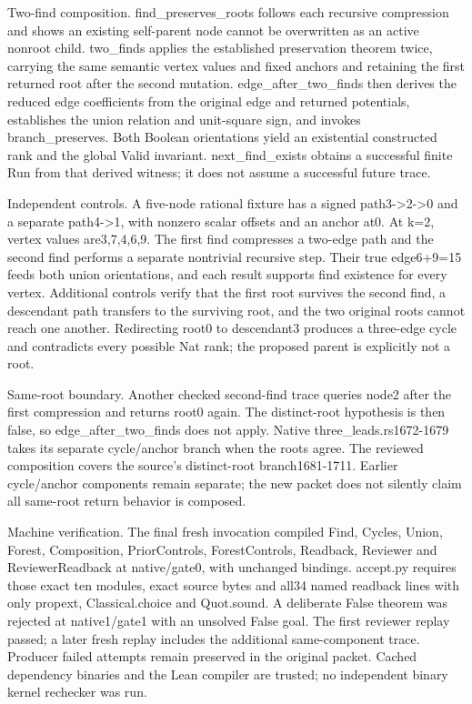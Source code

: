 \documentclass[10pt]{article}
\begin{document}
Two-find composition. find\_preserves\_roots follows each recursive compression and shows an existing self-parent node cannot be overwritten as an active nonroot child. two\_finds applies the established preservation theorem twice, carrying the same semantic vertex values and fixed anchors and retaining the first returned root after the second mutation. edge\_after\_two\_finds then derives the reduced edge coefficients from the original edge and returned potentials, establishes the union relation and unit-square sign, and invokes branch\_preserves. Both Boolean orientations yield an existential constructed rank and the global Valid invariant. next\_find\_exists obtains a successful finite Run from that derived witness; it does not assume a successful future trace.\par\medskip
Independent controls. A five-node rational fixture has a signed path3->2->0 and a separate path4->1, with nonzero scalar offsets and an anchor at0. At k=2, vertex values are3,7,4,6,9. The first find compresses a two-edge path and the second find performs a separate nontrivial recursive step. Their true edge6+9=15 feeds both union orientations, and each result supports find existence for every vertex. Additional controls verify that the first root survives the second find, a descendant path transfers to the surviving root, and the two original roots cannot reach one another. Redirecting root0 to descendant3 produces a three-edge cycle and contradicts every possible Nat rank; the proposed parent is explicitly not a root.\par\medskip
Same-root boundary. Another checked second-find trace queries node2 after the first compression and returns root0 again. The distinct-root hypothesis is then false, so edge\_after\_two\_finds does not apply. Native three\_leads.rs1672-1679 takes its separate cycle/anchor branch when the roots agree. The reviewed composition covers the source's distinct-root branch1681-1711. Earlier cycle/anchor components remain separate; the new packet does not silently claim all same-root return behavior is composed.\par\medskip
Machine verification. The final fresh invocation compiled Find, Cycles, Union, Forest, Composition, PriorControls, ForestControls, Readback, Reviewer and ReviewerReadback at native/gate0, with unchanged bindings. accept.py requires those exact ten modules, exact source bytes and all34 named readback lines with only propext, Classical.choice and Quot.sound. A deliberate False theorem was rejected at native1/gate1 with an unsolved False goal. The first reviewer replay passed; a later fresh replay includes the additional same-component trace. Producer failed attempts remain preserved in the original packet. Cached dependency binaries and the Lean compiler are trusted; no independent binary kernel rechecker was run.\par\medskip
\end{document}
